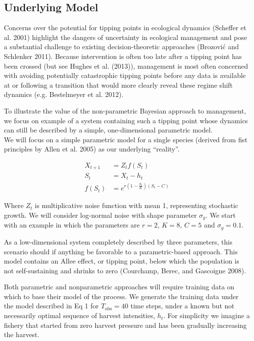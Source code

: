 \documentclass[author-year, review]{elsarticle} %
\begin{document}
\subsection{Underlying Model}

Concerns over the potential for tipping points in ecological dynamics
(Scheffer et al. 2001) highlight the dangers of uncertainty in
ecological management and pose a substantial challenge to existing
decision-theoretic approaches (Brozović and Schlenker 2011). Because
intervention is often too late after a tipping point has been crossed
(but see Hughes et al. (2013)), management is most often concerned with
avoiding potentially catastrophic tipping points before any data is
available at or following a transition that would more clearly reveal
these regime shift dynamics (e.g. Bestelmeyer et al. 2012).

To illustrate the value of the non-parametric Bayesian approach to
management, we focus on example of a system containing such a tipping
point whose dynamics can still be described by a simple, one-dimensional
parametric model.\\We will focus on a simple parametric model for a
single species (derived from fist principles by Allen et al. 2005) as
our underlying ``reality''.

\begin{align}
X_{t+1} &= Z_t f(S_t) \\
S_t &= X_t - h_t \\
f(S_t) &= e^{r \left(1 - \frac{S_t}{K}\right)\left(S_t - C\right)}
\end{align}

Where $Z_t$ is multiplicative noise function with mean 1, representing
stochastic growth. We will consider log-normal noise with shape
parameter $\sigma_g$. We start with an example in which the parameters
are $r =2$, $K=8$, $C=5$ and $\sigma_g = 0.1$.

As a low-dimensional system completely described by three parameters,
this scenario should if anything be favorable to a parametric-based
approach. This model contains an Allee effect, or tipping point, below
which the population is not self-sustaining and shrinks to zero
(Courchamp, Berec, and Gascoigne 2008).

Both parametric and nonparametric approaches will require training data
on which to base their model of the process. We generate the training
data under the model described in Eq 1 for $T_{\textrm{obs}}=40$ time
steps, under a known but not necessarily optimal sequence of harvest
intensities, $h_t$. For simplicity we imagine a fishery that started
from zero harvest pressure and has been gradually increasing the
harvest.
\end{document}
